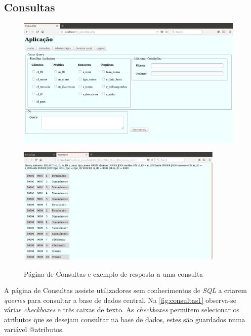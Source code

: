 \documentclass[11pt,twoside,a4paper]{report}
\begin{document}
\subsection{Consultas}
\begin{figure}[H]
	\centering
	\begin{minipage}{1.\textwidth}
		\begin{center}
			\includegraphics[width=.9\textwidth]{consultas01} %
			\label{fig:consultas1}
		\end{center}
	\end{minipage}
	\begin{minipage}{1.\textwidth}
		\begin{center}
			\includegraphics[width=0.9\textwidth]{consultas02} %
			\label{fig:consultas2}
		\end{center}
	\end{minipage}
	\caption{Página de Consultas e exemplo de resposta a uma consulta}
	\label{fig:consultas0}
\end{figure}
A página de Consultas assiste utilizadores sem conhecimentos de \textit{SQL} a criarem \textit{queries} para consultar a base de dados central. Na \autoref{fig:consultas1} observa-se várias \textit{checkboxes} e três caixas de texto. As \textit{checkboxes} permitem selecionar os atributos que se desejam consultar na base de dados, estes são guardados numa variável @atributos.
\end{document}
